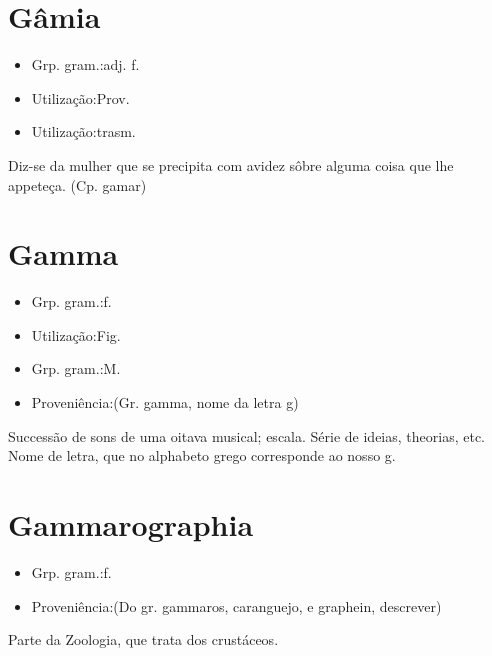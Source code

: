\section{Gâmia}
\begin{itemize}
\item {Grp. gram.:adj. f.}
\end{itemize}
\begin{itemize}
\item {Utilização:Prov.}
\end{itemize}
\begin{itemize}
\item {Utilização:trasm.}
\end{itemize}
Diz-se da mulher que se precipita com avidez sôbre alguma coisa que lhe appeteça.
(Cp. \textunderscore gamar\textunderscore )
\section{Gamma}
\begin{itemize}
\item {Grp. gram.:f.}
\end{itemize}
\begin{itemize}
\item {Utilização:Fig.}
\end{itemize}
\begin{itemize}
\item {Grp. gram.:M.}
\end{itemize}
\begin{itemize}
\item {Proveniência:(Gr. \textunderscore gamma\textunderscore , nome da letra \textunderscore g\textunderscore )}
\end{itemize}
Successão de sons de uma oitava musical; escala.
Série de ideias, theorias, etc.
Nome de letra, que no alphabeto grego corresponde ao nosso \textunderscore g\textunderscore .
\section{Gammarographia}
\begin{itemize}
\item {Grp. gram.:f.}
\end{itemize}
\begin{itemize}
\item {Proveniência:(Do gr. \textunderscore gammaros\textunderscore , caranguejo, e \textunderscore graphein\textunderscore , descrever)}
\end{itemize}
Parte da Zoologia, que trata dos crustáceos.
